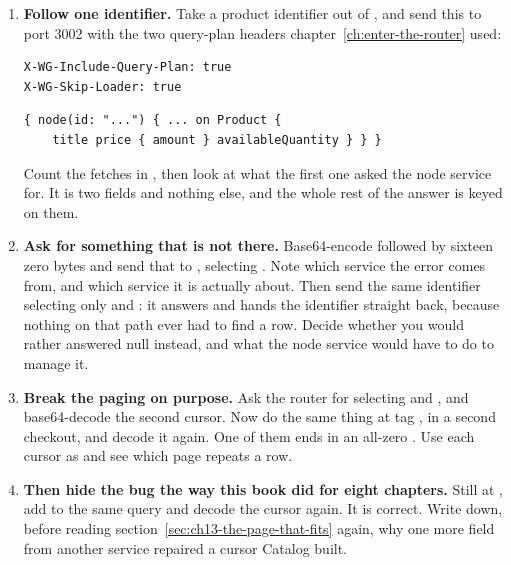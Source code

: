 \begin{enumerate}
  \item \textbf{Follow one identifier.} Take a product identifier out of
  , and send this to port 3002 with the two query-plan
  headers chapter~\ref{ch:enter-the-router} used:

  \begin{verbatim}
X-WG-Include-Query-Plan: true
X-WG-Skip-Loader: true
  \end{verbatim}

  \begin{verbatim}
{ node(id: "...") { ... on Product {
    title price { amount } availableQuantity } } }
  \end{verbatim}

  Count the fetches in , then look at what the first
  one asked the node service for. It is two fields and nothing else, and the
  whole rest of the answer is keyed on them.

  \item \textbf{Ask for something that is not there.} Base64-encode
   followed by sixteen zero bytes and send that to ,
  selecting . Note which service the error comes from, and which
  service it is actually about. Then send the same identifier selecting only
   and : it answers  and hands the
  identifier straight back, because nothing on that path ever had to find a row.
  Decide whether you would rather  answered null instead, and what the
  node service would have to do to manage it.

  \item \textbf{Break the paging on purpose.} Ask the router for
   selecting  and
  , and base64-decode the second cursor. Now do the same
  thing at tag , in a second checkout, and decode it again. One of
  them ends in an all-zero . Use each cursor as  and see
  which page repeats a row.

  \item \textbf{Then hide the bug the way this book did for eight chapters.}
  Still at , add  to the same query and
  decode the cursor again. It is correct. Write down, before reading
  section~\ref{sec:ch13-the-page-that-fits} again, why one more field from
  another service repaired a cursor Catalog built.


\end{enumerate}
